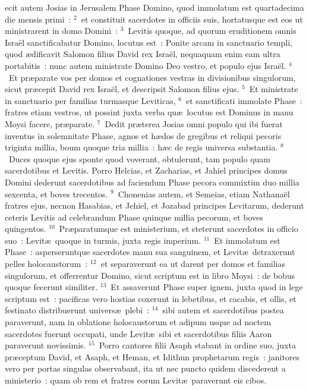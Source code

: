 \bchapter
{}ecit autem Josias in Jerusalem Phase Domino, quod immolatum est quartadecima die mensis primi~:
${}^{2}$~et constituit sacerdotes in officiis suis, hortatusque est eos ut ministrarent in domo Domini~:
${}^{3}$~Levitis quoque, ad quorum eruditionem omnis Isra\"el sanctificabatur Domino, locutus est~: Ponite arcam in sanctuario templi, quod \ae dificavit Salomon filius David rex Isra\"el, nequaquam enim eam ultra portabitis~: nunc autem ministrate Domino Deo vestro, et populo ejus Isra\"el.
${}^{4}$~Et pr\ae parate vos per domos et cognationes vestras in divisionibus singulorum, sicut pr\ae cepit David rex Isra\"el, et descripsit Salomon filius ejus.
${}^{5}$~Et ministrate in sanctuario per familias turmasque Leviticas,
${}^{6}$~et sanctificati immolate Phase~: fratres etiam vestros, ut possint juxta verba qu\ae\ locutus est Dominus in manu Moysi facere, pr\ae parate.
${}^{7}$~Dedit pr\ae terea Josias omni populo qui ibi fuerat inventus in solemnitate Phase, agnos et h\ae dos de gregibus et reliqui pecoris triginta millia, boum quoque tria millia~: h\ae c de regis universa substantia.
${}^{8}$~Duces quoque ejus sponte quod voverant, obtulerunt, tam populo quam sacerdotibus et Levitis. Porro Helcias, et Zacharias, et Jahiel principes domus Domini dederunt sacerdotibus ad faciendum Phase pecora commixtim duo millia sexcenta, et boves trecentos.
${}^{9}$~Chonenias autem, et Semeias, etiam Nathana\"el fratres ejus, necnon Hasabias, et Jehiel, et Jozabad principes Levitarum, dederunt ceteris Levitis ad celebrandum Phase quinque millia pecorum, et boves quingentos.
${}^{10}$~Pr\ae paratumque est ministerium, et steterunt sacerdotes in officio suo~: Levit\ae\ quoque in turmis, juxta regis imperium.
${}^{11}$~Et immolatum est Phase~: asperseruntque sacerdotes manu sua sanguinem, et Levit\ae\ detraxerunt pelles holocaustorum~:
${}^{12}$~et separaverunt ea ut darent per domos et familias singulorum, et offerrentur Domino, sicut scriptum est in libro Moysi~: de bobus quoque fecerunt similiter.
${}^{13}$~Et assaverunt Phase super ignem, juxta quod in lege scriptum est~: pacificas vero hostias coxerunt in lebetibus, et cacabis, et ollis, et festinato distribuerunt univers\ae\ plebi~:
${}^{14}$~sibi autem et sacerdotibus postea paraverunt, nam in oblatione holocaustorum et adipum usque ad noctem sacerdotes fuerunt occupati, unde Levit\ae\ sibi et sacerdotibus filiis Aaron paraverunt novissimis.
${}^{15}$~Porro cantores filii Asaph stabant in ordine suo, juxta pr\ae ceptum David, et Asaph, et Heman, et Idithun prophetarum regis~: janitores vero per portas singulas observabant, ita ut nec puncto quidem discederent a ministerio~: quam ob rem et fratres eorum Levit\ae\ paraverunt eis cibos.
